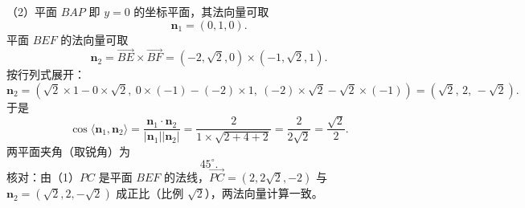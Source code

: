 \begin{answer}
（2）平面 $BAP$ 即 $y=0$ 的坐标平面，其法向量可取
\nopagebreak[4]
\[\boldsymbol n_1=(0,1,0).\]
平面 $BEF$ 的法向量可取
\nopagebreak[4]
\[\boldsymbol n_2=\overrightarrow{BE}\times\overrightarrow{BF}=(-2,\sqrt2,0)\times(-1,\sqrt2,1).\]
按行列式展开：
\nopagebreak[4]
\[\boldsymbol n_2=\left(\sqrt2\times1-0\times\sqrt2,\ 0\times(-1)-(-2)\times 1,\ (-2)\times\sqrt2-\sqrt2\times(-1)\right)=(\sqrt2,\,2,\,-\sqrt2).\]
于是
\nopagebreak[4]
\[\cos\langle\boldsymbol n_1,\boldsymbol n_2\rangle=\frac{\boldsymbol n_1\cdot\boldsymbol n_2}{|\boldsymbol n_1||\boldsymbol n_2|}=\frac{2}{1\times\sqrt{2+4+2}}=\frac{2}{2\sqrt2}=\frac{\sqrt2}{2}.\]
两平面夹角（取锐角）为
\nopagebreak[4]
\[45^\circ.\]
核对：由（1）$PC$ 是平面 $BEF$ 的法线，$\overrightarrow{PC}=(2,2\sqrt2,-2)$ 与 $\boldsymbol n_2=(\sqrt2,2,-\sqrt2)$ 成正比（比例 $\sqrt2$），两法向量计算一致。


\end{answer}

